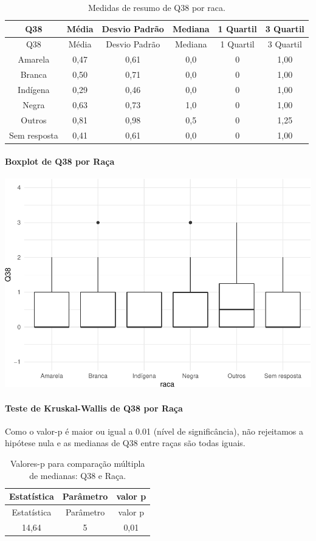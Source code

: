 \documentclass[]{article}
\let\oldparagraph\paragraph
\renewcommand{\paragraph}[1]{\oldparagraph{#1}\mbox{}}
\begin{document}
\begin{longtable}[]{@{}cccccc@{}}
\caption{\label{tab:unnamed-chunk-1463}Medidas de resumo de Q38 por raca.}\tabularnewline
\toprule
Q38 & Média & Desvio Padrão & Mediana & 1 Quartil & 3 Quartil\tabularnewline
\midrule
\endfirsthead
\toprule
Q38 & Média & Desvio Padrão & Mediana & 1 Quartil & 3 Quartil\tabularnewline
\midrule
\endhead
Amarela & 0,47 & 0,61 & 0,0 & 0 & 1,00\tabularnewline
Branca & 0,50 & 0,71 & 0,0 & 0 & 1,00\tabularnewline
Indígena & 0,29 & 0,46 & 0,0 & 0 & 1,00\tabularnewline
Negra & 0,63 & 0,73 & 1,0 & 0 & 1,00\tabularnewline
Outros & 0,81 & 0,98 & 0,5 & 0 & 1,25\tabularnewline
Sem resposta & 0,41 & 0,61 & 0,0 & 0 & 1,00\tabularnewline
\bottomrule
\end{longtable}

\hypertarget{boxplot-de-q38-por-rauxe7a}{%
\paragraph{Boxplot de Q38 por Raça}\label{boxplot-de-q38-por-rauxe7a}}

\begin{center}\includegraphics[width=0.75\linewidth]{relatorio_covid19_files/figure-latex/unnamed-chunk-1464-1} \end{center}

\hypertarget{teste-de-kruskal-wallis-de-q38-por-rauxe7a}{%
\paragraph{Teste de Kruskal-Wallis de Q38 por Raça}\label{teste-de-kruskal-wallis-de-q38-por-rauxe7a}}

Como o valor-p é maior ou igual a 0.01 (nível de significância), não rejeitamos a hipótese nula e as medianas de Q38 entre raças são todas iguais.

\begin{longtable}[]{@{}ccc@{}}
\caption{\label{tab:unnamed-chunk-1466}Valores-p para comparação múltipla de medianas: Q38 e Raça.}\tabularnewline
\toprule
Estatística & Parâmetro & valor p\tabularnewline
\midrule
\endfirsthead
\toprule
Estatística & Parâmetro & valor p\tabularnewline
\midrule
\endhead
14,64 & 5 & 0,01\tabularnewline
\bottomrule
\end{longtable}
\end{document}
